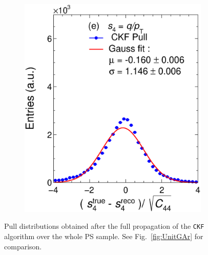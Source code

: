 \begin{figure}[t]
\begin{subfigure}{0.32\textwidth}
         \includegraphics[width=\textwidth]{figures/ch5-KF_NDGAr/FullSample/Int/Units/Unit4.eps}
         \caption{}
         \label{fig:resp4KFGAr_Int}
     \end{subfigure}
        \caption{Pull distributions obtained after the full propagation of the \texttt{CKF} algorithm over the whole PS sample. See Fig.~\ref{fig:UnitGAr} for comparison.}
        \label{fig:UnitGArKF_Int}
\end{figure}

